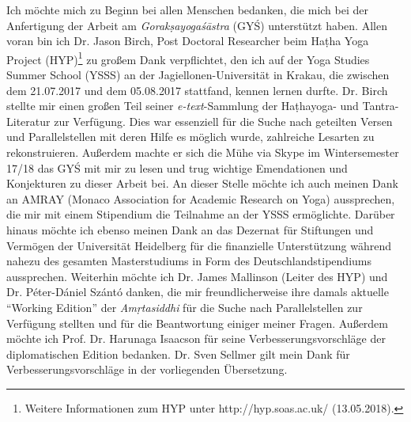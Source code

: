 \documentclass[a4paper,12pt]{article}
\begin{document}
Ich möchte mich zu Beginn bei allen Menschen bedanken, die mich bei der Anfertigung der Arbeit am \textit{Gorakṣayogaśāstra} (GYŚ) unterstützt haben. Allen voran bin ich Dr. Jason Birch, Post Doctoral Researcher beim Haṭha Yoga Project (HYP)\footnote{Weitere Informationen zum HYP unter http://hyp.soas.ac.uk/ (13.05.2018).} zu großem Dank verpflichtet, den ich auf der Yoga Studies Summer School (YSSS) an der Jagiellonen-Universität in Krakau, die zwischen dem 21.07.2017 und dem 05.08.2017 stattfand, kennen lernen durfte. Dr. Birch stellte mir einen großen Teil seiner \textit{e-text}-Sammlung der Haṭhayoga- und Tantra-Literatur zur Verfügung. Dies war essenziell für die Suche nach geteilten Versen und Parallelstellen mit deren Hilfe es möglich wurde, zahlreiche Lesarten zu rekonstruieren. Außerdem machte er sich die Mühe via Skype im Wintersemester 17/18 das GYŚ mit mir zu lesen und trug wichtige Emendationen und Konjekturen zu dieser Arbeit bei. An dieser Stelle möchte ich auch meinen Dank an AMRAY (Monaco Association for Academic Research on Yoga) aussprechen, die mir mit einem Stipendium die Teilnahme an der YSSS ermöglichte. Darüber hinaus möchte ich ebenso meinen Dank an das Dezernat für Stiftungen und Vermögen der Universität Heidelberg für die finanzielle Unterstützung während nahezu des gesamten Masterstudiums in Form des Deutschlandstipendiums aussprechen. Weiterhin möchte ich Dr. James Mallinson (Leiter des HYP) und Dr. Péter-Dániel Szántó danken, die mir freundlicherweise ihre damals aktuelle ``Working Edition'' der \textit{Amṛtasiddhi} für die Suche nach Parallelstellen zur Verfügung stellten und für die Beantwortung einiger meiner Fragen. Außerdem möchte ich Prof. Dr. Harunaga Isaacson für seine Verbesserungsvorschläge der diplomatischen Edition bedanken. Dr. Sven Sellmer gilt mein Dank für Verbesserungsvorschläge in der vorliegenden Übersetzung. 
\end{document}
